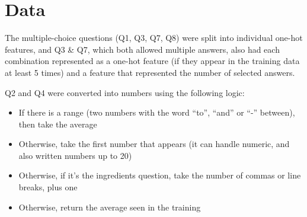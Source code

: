 \section{Data}






The multiple-choice questions (Q1, Q3, Q7, Q8) were split into individual one-hot features, and Q3 & Q7, which both allowed multiple answers, also had each combination represented as a one-hot feature (if they appear in the training data at least 5 times) and a feature that represented the number of selected answers.

Q2 and Q4 were converted into numbers using the following logic:
\begin{itemize}
    \item If there is a range (two numbers with the word “to”, “and” or “-” between), then take the average
    \item Otherwise, take the first number that appears (it can handle numeric, and also written numbers up to 20)
    \item Otherwise, if it’s the ingredients question, take the number of commas or line breaks, plus one
    \item Otherwise, return the average seen in the training
\end{itemize}

